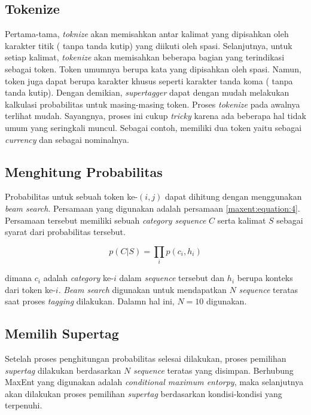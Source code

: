 \subsection{Tokenize}

Pertama-tama, \textit{toknize} akan memisahkan antar kalimat yang dipisahkan oleh karakter titik
( tanpa tanda kutip) yang diikuti oleh spasi. Selanjutnya, untuk setiap kalimat,
\textit{tokenize} akan memisahkan beberapa bagian yang terindikasi sebagai token.
Token umumnya berupa kata yang dipisahkan oleh spasi.
Namun, token juga dapat berupa karakter khusus seperti karakter tanda koma (\say{,} tanpa tanda kutip).
Dengan demikian, \textit{supertagger} dapat dengan mudah melakukan kalkulasi probabilitas untuk
masing-masing token.
Proses \textit{tokenize} pada awalnya terlihat mudah.
Sayangnya, proses ini cukup \textit{tricky} karena ada beberapa hal tidak umum yang seringkali muncul.
Sebagai contoh,  memiliki dua token yaitu  sebagai \textit{currency} dan
 sebagai nominalnya.

\subsection{Menghitung Probabilitas}

Probabilitas untuk sebuah token ke-$(i, j)$ dapat dihitung dengan menggunakan \textit{beam search}.
Persamaan yang digunakan adalah persamaan \ref{maxent:equation:4}.
Persamaan tersebut memiliki sebuah \textit{category sequence} $C$ serta kalimat $S$ sebagai syarat
dari probabilitas tersebut.

\begin{equation}\label{maxent:equation:4}
	p(C|S) = \prod_i p(c_i, h_i)
\end{equation}

\noindent
dimana $c_i$ adalah \textit{category} ke-$i$ dalam \textit{sequence} tersebut dan $h_i$ berupa konteks
dari token ke-$i$.
\textit{Beam search} digunakan untuk mendapatkan $N$ \textit{sequence} teratas saat proses
\textit{tagging} dilakukan.
Dalamn hal ini, $N = 10$ digunakan.

\subsection{Memilih Supertag}

Setelah proses penghitungan probabilitas selesai dilakukan, proses pemilihan \textit{supertag} dilakukan
berdasarkan $N$ \textit{sequence} teratas yang disimpan.
Berhubung MaxEnt yang digunakan adalah \textit{conditional maximum entorpy}, maka selanjutnya akan
dilakukan proses pemilihan \textit{supertag} berdasarkan kondisi-kondisi yang terpenuhi.
